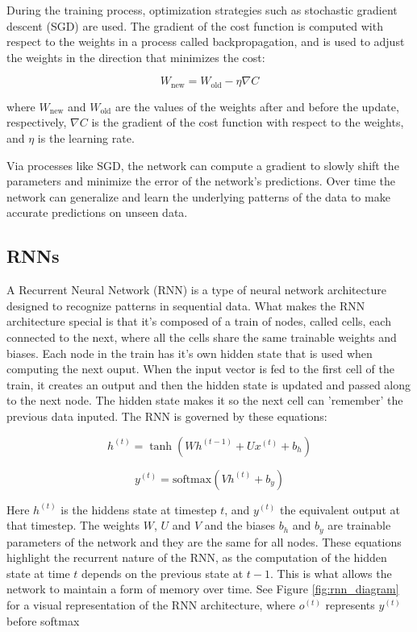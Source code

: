 \documentclass[11pt]{article}
\begin{document}
During the training process, optimization strategies such as stochastic gradient descent (SGD) are used. The gradient of the cost function is computed with respect to the weights in a process called backpropagation, and is used to adjust the weights in the direction that minimizes the cost:

\[ W_{\text{new}} = W_{\text{old}} - \eta \nabla C \]

where \(W_{\text{new}}\) and \(W_{\text{old}}\) are the values of the weights after and before the update, respectively, \(\nabla C\) is the gradient of the cost function with respect to the weights, and \(\eta\) is the learning rate.

Via processes like SGD, the network can compute a gradient to slowly shift the parameters and minimize the error of the network's predictions. Over time the network can generalize and learn the underlying patterns of the data to make accurate predictions on unseen data.

\subsection{RNNs}
A Recurrent Neural Network (RNN) is a type of neural network architecture designed to recognize patterns in sequential data. What makes the RNN architecture special is that it's composed of a train of nodes, called cells, each connected to the next, where all the cells share the same trainable weights and biases. Each node in the train has it's own hidden state that is used when computing the next ouput. When the input vector is fed to the first cell of the train, it creates an output and then the hidden state is updated and passed along to the next node. The hidden state makes it so the next cell can 'remember' the previous data inputed. The RNN is governed by these equations:

\begin{equation}
h^{(t)} = \tanh(Wh^{(t-1)} + Ux^{(t)} + b_h)
\end{equation}

\begin{equation}
y^{(t)} = \text{softmax}(Vh^{(t)} + b_y)
\end{equation}

Here \(h^{(t)}\) is the hiddens state at timestep $t$, and \(y^{(t)}\) the equivalent output at that timestep. The weights $W$, $U$ and $V$ and the biases $b_h$ and $b_y$ are trainable parameters of the network and they are the same for all nodes. These equations highlight the recurrent nature of the RNN, as the computation of the hidden state at time $t$ depends on the previous state at $t-1$. This is what allows the network to maintain a form of memory over time. See Figure \ref{fig:rnn_diagram} for a visual representation of the RNN architecture, where $o^{(t)}$ represents $y^{(t)}$ before softmax
\end{document}
